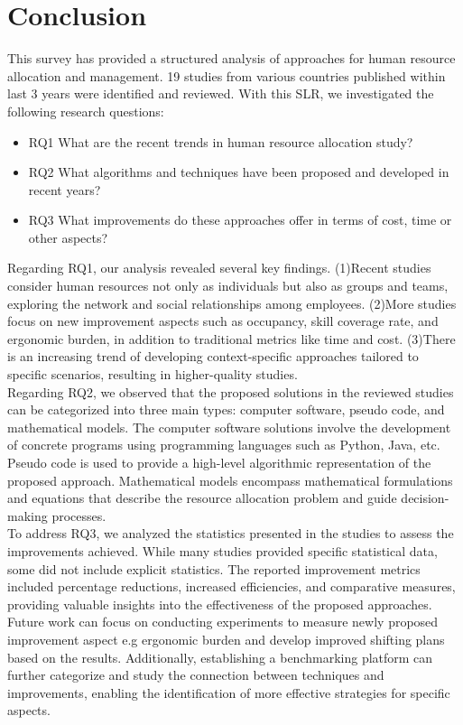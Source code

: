 \documentclass[runningheads]{llncs}
\begin{document}
\section{Conclusion}
This survey has provided a structured analysis of approaches for human resource allocation and management. 19 studies from various countries published within last 3 years were identified and reviewed. With this SLR, we investigated the following research questions:
\begin{itemize}
    \item RQ1 What are the recent trends in human resource allocation study?
    \item RQ2 What algorithms and techniques have been proposed and developed in recent years?
    \item RQ3 What improvements do these approaches offer in terms of cost, time or other aspects?\\
    \end{itemize}
Regarding RQ1, our analysis revealed several key findings. (1)Recent studies consider human resources not only as individuals but also as groups and teams, exploring the network and social relationships among employees. (2)More studies focus on new improvement aspects such as occupancy, skill coverage rate, and ergonomic burden, in addition to traditional metrics like time and cost. (3)There is an increasing trend of developing context-specific approaches tailored to specific scenarios, resulting in higher-quality studies.\\
Regarding RQ2, we observed that the proposed solutions in the reviewed studies can be categorized into three main types: computer software, pseudo code, and mathematical models. The computer software solutions involve the development of concrete programs using programming languages such as Python, Java, etc. Pseudo code is used to provide a high-level algorithmic representation of the proposed approach. Mathematical models encompass mathematical formulations and equations that describe the resource allocation problem and guide decision-making processes.\\
To address RQ3, we analyzed the statistics presented in the studies to assess the improvements achieved. While many studies provided specific statistical data, some did not include explicit statistics. The reported improvement metrics included percentage reductions, increased efficiencies, and comparative measures, providing valuable insights into the effectiveness of the proposed approaches.\\
Future work can focus on conducting experiments to measure newly proposed improvement aspect e.g ergonomic burden and develop improved shifting plans based on the results. Additionally, establishing a benchmarking platform can further categorize and study the connection between techniques and improvements, enabling the identification of more effective strategies for specific aspects.
\end{document}
